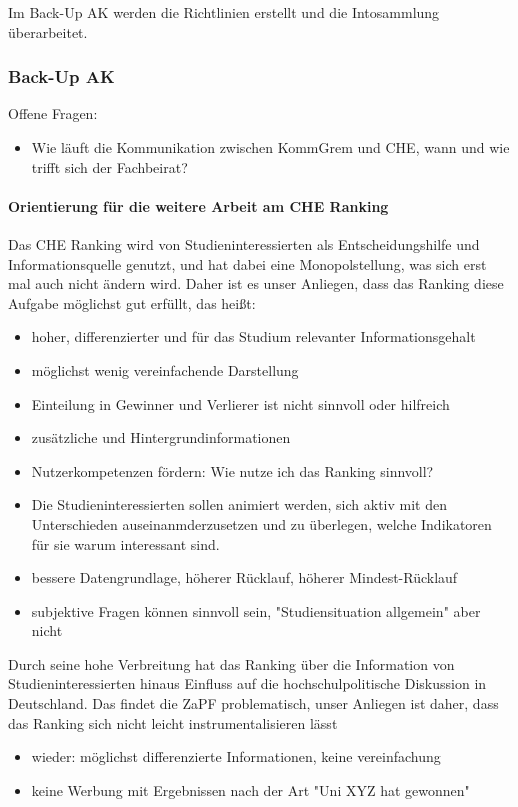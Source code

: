       Im Back-Up AK werden die Richtlinien erstellt und die Intosammlung überarbeitet.

    \subsubsection{Back-Up AK}
    Offene Fragen:
    \begin{itemize}
      \item Wie läuft die Kommunikation zwischen KommGrem und CHE, wann und wie trifft sich der Fachbeirat?
    \end{itemize}

    \paragraph{Orientierung für die weitere Arbeit am CHE Ranking}

      Das CHE Ranking wird von Studieninteressierten als Entscheidungshilfe und Informationsquelle genutzt, und hat dabei eine Monopolstellung, was sich erst mal auch nicht ändern wird. Daher ist es unser Anliegen, dass das Ranking diese Aufgabe möglichst gut erfüllt, das heißt:
      \begin{itemize}
        \item hoher, differenzierter und für das Studium relevanter Informationsgehalt
        \item möglichst wenig vereinfachende Darstellung
        \item Einteilung in Gewinner und Verlierer ist nicht sinnvoll oder hilfreich
        \item zusätzliche und Hintergrundinformationen
        \item Nutzerkompetenzen fördern: Wie nutze ich das Ranking sinnvoll?
        \item Die Studieninteressierten sollen animiert werden, sich aktiv mit den Unterschieden auseinanmderzusetzen und zu überlegen, welche Indikatoren für sie warum interessant sind.
        \item bessere Datengrundlage, höherer Rücklauf, höherer Mindest-Rücklauf
        \item subjektive Fragen können sinnvoll sein, "Studiensituation allgemein" aber nicht
      \end{itemize}

      Durch seine hohe Verbreitung hat das Ranking über die Information von Studieninteressierten hinaus Einfluss auf die hochschulpolitische Diskussion in Deutschland. Das findet die ZaPF problematisch, unser Anliegen ist daher, dass das Ranking sich nicht leicht instrumentalisieren lässt
      \begin{itemize}
        \item wieder: möglichst differenzierte Informationen, keine vereinfachung
        \item keine Werbung mit Ergebnissen nach der Art "Uni XYZ hat gewonnen"
      \end{itemize}

